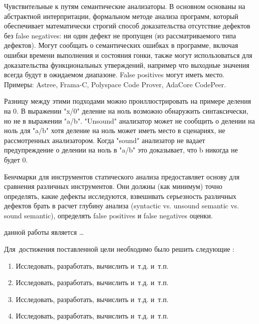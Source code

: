 Чувствительные к путям семантические анализаторы. В основном основаны на абстрактной 
интерпритации, формальном методе анализа программ, который обеспечивает математически
строгий способ доказательства отсутствие дефектов без false negatives: ни один дефект 
не пропущен (из рассматриваемого типа дефектов). Могут сообщать о 
семантических ошибках в программе, включая ошибки времени выполнения и состояния гонки,
также могут использоваться для доказательства функциональных утверждений, например что 
выходные значения всегда будут в ожидаемом диапазоне. False positives могут иметь место. 
Примеры: Astree\autocite{astree-analyzer},
Frama-C\autocite{frama-c-analyzer}, Polyspace Code Prover\autocite{polyspace-code-analyzer}, 
AdaCore CodePeer\autocite{}.

Разницу между этими подходами можно проиллюстрировать на примере деления на 0. В выражении 
"x/0" деление на ноль возможно обнаружить синтаксически, но не в выражении "a/b". "Unsound" анализатор 
может не сообщить о делении на ноль для "a/b" хотя деление на ноль может иметь место в сценариях,
не рассмотренных анализатором. Когда "sound" анализатор не вадает предупреждение о делении на ноль
в "a/b" это доказывает, что b никогда не будет 0. 

Бенчмарки для инструментов статического анализа предоставляет основу для сравнения
различных инструментов. Они должны (как минимум) точно определять, какие дефекты исследуются,
взвешивать серьезность различных дефектов %
брать в расчет глубину анализа (syntactic vs. unsound semantic vs. sound semantic), определять
false positives и false negatives оценки.



{\aim} данной работы является \ldots

Для~достижения поставленной цели необходимо было решить следующие {\tasks}:
\begin{enumerate}[beginpenalty=10000] %
  \item Исследовать, разработать, вычислить и~т.\:д. и~т.\:п.
  \item Исследовать, разработать, вычислить и~т.\:д. и~т.\:п.
  \item Исследовать, разработать, вычислить и~т.\:д. и~т.\:п.
  \item Исследовать, разработать, вычислить и~т.\:д. и~т.\:п.
\end{enumerate}


